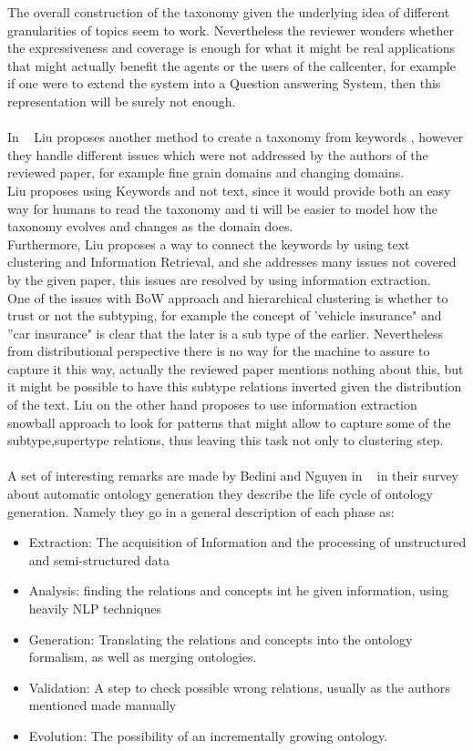 \documentclass[4pt,a4paper,twocolumn]{article}
\begin{document}
The overall construction of the taxonomy given the underlying idea of different granularities of topics seem to work. Nevertheless the reviewer wonders whether the expressiveness and coverage is enough for what it might be real applications that might actually benefit the agents or the users of the callcenter, for example if one were to extend the system into a Question answering System, then this representation will be surely not enough.\\
\\
In ~\cite{DBLP:conf/kdd/LiuSLW12} Liu proposes another method to create a taxonomy from keywords , however they handle different issues which were not addressed by the authors of the reviewed paper, for example fine grain domains and changing domains.\\
Liu proposes using Keywords and not text, since it would provide both an easy way for humans to read the taxonomy and ti will be easier to model how the taxonomy evolves and changes as the domain does.\\
Furthermore, Liu proposes a way to connect the keywords by using text clustering and Information Retrieval, and she addresses many issues not covered by the given paper, this issues are resolved by using information extraction.\\
One of the issues with BoW approach and hierarchical clustering is whether to trust or not the subtyping, for example the concept of 'vehicle insurance" and ''car insurance"  is clear that the later is a sub type of the earlier. Nevertheless from distributional perspective there is no way for the machine to assure to capture it this way, actually the reviewed paper mentions nothing about this, but it might be possible to have this subtype relations inverted given the distribution of the text. Liu on the other hand proposes to use information extraction snowball approach to look for patterns that might allow to capture some of the subtype,supertype relations, thus leaving this task not only to clustering step.\\
\\
A set of interesting remarks are made by  Bedini and Nguyen in ~\cite{artofontology} in their survey about automatic ontology generation they describe the life cycle of ontology generation. Namely they go in a general description of each phase as:
\begin{itemize}
	\item Extraction: The acquisition of Information and the processing of unstructured and semi-structured data
	\item Analysis: finding the relations and concepts int he given information, using heavily NLP techniques
	\item Generation: Translating the relations and concepts into the ontology formalism, as well as merging ontologies.
	\item Validation: A step to check possible wrong relations, usually as the authors mentioned made manually
	\item Evolution: The possibility of an incrementally growing ontology.
\end{itemize}
\end{document}
